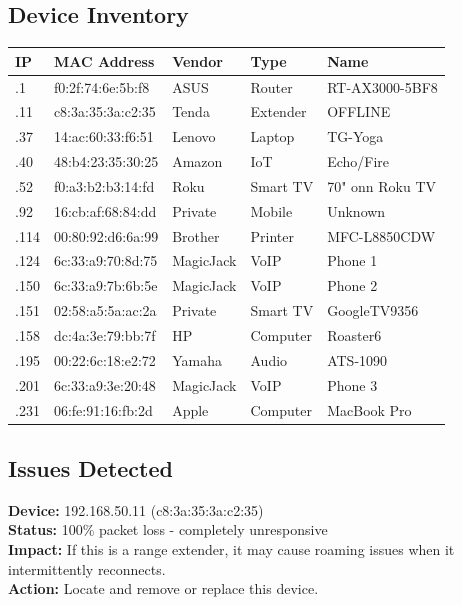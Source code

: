 \documentclass[11pt,letterpaper]{article}
\begin{document}
\subsection{Device Inventory}

\begin{longtable}{@{}lllll@{}}
\toprule
\textbf{IP} & \textbf{MAC Address} & \textbf{Vendor} & \textbf{Type} & \textbf{Name} \\
\midrule
\endhead
.1 & f0:2f:74:6e:5b:f8 & ASUS & Router & RT-AX3000-5BF8 \\
.11 & c8:3a:35:3a:c2:35 & Tenda & Extender & \textcolor{warningcolor}{OFFLINE} \\
.37 & 14:ac:60:33:f6:51 & Lenovo & Laptop & TG-Yoga \\
.40 & 48:b4:23:35:30:25 & Amazon & IoT & Echo/Fire \\
.52 & f0:a3:b2:b3:14:fd & Roku & Smart TV & 70" onn Roku TV \\
.92 & 16:cb:af:68:84:dd & Private & Mobile & Unknown \\
.114 & 00:80:92:d6:6a:99 & Brother & Printer & MFC-L8850CDW \\
.124 & 6c:33:a9:70:8d:75 & MagicJack & VoIP & Phone 1 \\
.150 & 6c:33:a9:7b:6b:5e & MagicJack & VoIP & Phone 2 \\
.151 & 02:58:a5:5a:ac:2a & Private & Smart TV & GoogleTV9356 \\
.158 & dc:4a:3e:79:bb:7f & HP & Computer & Roaster6 \\
.195 & 00:22:6c:18:e2:72 & Yamaha & Audio & ATS-1090 \\
.201 & 6c:33:a9:3e:20:48 & MagicJack & VoIP & Phone 3 \\
.231 & 06:fe:91:16:fb:2d & Apple & Computer & MacBook Pro \\
\bottomrule
\end{longtable}

\subsection{Issues Detected}

\begin{tcolorbox}[colback=warningcolor!10,colframe=warningcolor,title=Warning: Tenda Device Offline]
\textbf{Device:} 192.168.50.11 (c8:3a:35:3a:c2:35)\\
\textbf{Status:} 100\% packet loss - completely unresponsive\\
\textbf{Impact:} If this is a range extender, it may cause roaming issues when it intermittently reconnects.\\
\textbf{Action:} Locate and remove or replace this device.
\end{tcolorbox}
\end{document}
